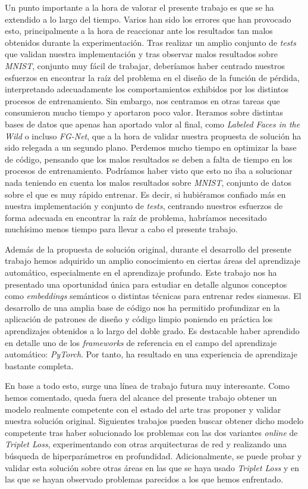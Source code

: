 Un punto importante a la hora de valorar el presente trabajo es que se ha extendido a lo largo del tiempo. Varios han sido los errores que han provocado esto, principalmente a la hora de reaccionar ante los resultados tan malos obtenidos durante la experimentación. Tras realizar un amplio conjunto de \textit{tests} que validan nuestra implementación y tras observar malos resultados sobre \textit{MNIST}, conjunto muy fácil de trabajar, deberíamos haber centrado nuestros esfuerzos en encontrar la raíz del problema en el diseño de la función de pérdida, interpretando adecuadamente los comportamientos exhibidos por los distintos procesos de entrenamiento. Sin embargo, nos centramos en otras tareas que consumieron mucho tiempo y aportaron poco valor. Iteramos sobre distintas bases de datos que apenas han aportado valor al final, como \textit{Labeled Faces in the Wild} o incluso \textit{FG-Net}, que a la hora de validar nuestra propuesta de solución ha sido relegada a un segundo plano. Perdemos mucho tiempo en optimizar la base de código, pensando que los malos resultados se deben a falta de tiempo en los procesos de entrenamiento. Podríamos haber visto que esto no iba a solucionar nada teniendo en cuenta los malos resultados sobre \textit{MNIST}, conjunto de datos sobre el que es muy rápido entrenar. Es decir, si hubiéramos confiado más en nuestra implementación y conjunto de \textit{tests}, centrando nuestros esfuerzos de forma adecuada en encontrar la raíz de problema, habríamos necesitado muchísimo menos tiempo para llevar a cabo el presente trabajo.

Además de la propuesta de solución original, durante el desarrollo del presente trabajo hemos adquirido un amplio conocimiento en ciertas áreas del aprendizaje automático, especialmente en el aprendizaje profundo. Este trabajo nos ha presentado una oportunidad única para estudiar en detalle algunos conceptos como \textit{embeddings} semánticos o distintas técnicas para entrenar redes siamesas. El desarrollo de una amplia base de código nos ha permitido profundizar en la aplicación de patrones de diseño y código limpio poniendo en práctica los aprendizajes obtenidos a lo largo del doble grado. Es destacable haber aprendido en detalle uno de los \textit{frameworks} de referencia en el campo del aprendizaje automático: \textit{PyTorch}. Por tanto, ha resultado en una experiencia de aprendizaje bastante completa.

En base a todo esto, surge una línea de trabajo futura muy interesante. Como hemos comentado, queda fuera del alcance del presente trabajo obtener un modelo realmente competente con el estado del arte tras proponer y validar nuestra solución original. Siguientes trabajos pueden buscar obtener dicho modelo competente tras haber solucionado los problemas con las dos variantes \textit{online} de \textit{Triplet Loss}, experimentando con otras arquitecturas de red y realizando una búsqueda de hiperparámetros en profundidad.
Adicionalmente, se puede probar y validar esta solución sobre otras áreas en las que se haya usado \textit{Triplet Loss} y en las que se hayan observado problemas parecidos a los que hemos enfrentado.

